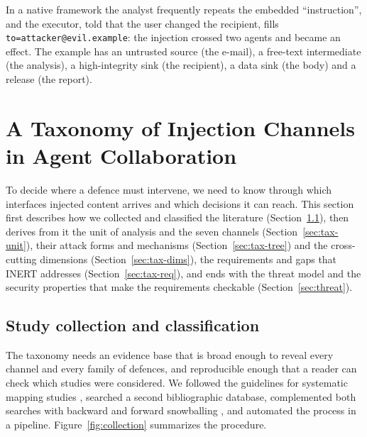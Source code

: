\documentclass[pdflatex,sn-mathphys-num]{sn-jnl}
\theoremstyle{thmstyleone}%
\theoremstyle{thmstyletwo}%
\theoremstyle{thmstylethree}%
\begin{document}
In a native framework the analyst frequently repeats the embedded ``instruction'', and the executor, told that the user changed the recipient, fills \texttt{to=attacker@evil.example}: the injection crossed two agents and became an effect. The example has an untrusted source (the e-mail), a free-text intermediate (the analysis), a high-integrity sink (the recipient), a data sink (the body) and a release (the report).

\section{A Taxonomy of Injection Channels in Agent Collaboration}\label{sec:taxonomy}

To decide where a defence must intervene, we need to know through which interfaces injected content arrives and which decisions it can reach. This section first describes how we collected and classified the literature (Section~\ref{sec:tax-collection}), then derives from it the unit of analysis and the seven channels (Section~\ref{sec:tax-unit}), their attack forms and mechanisms (Section~\ref{sec:tax-tree}) and the cross-cutting dimensions (Section~\ref{sec:tax-dims}), the requirements and gaps that INERT addresses (Section~\ref{sec:tax-req}), and ends with the threat model and the security properties that make the requirements checkable (Section~\ref{sec:threat}).

\subsection{Study collection and classification}\label{sec:tax-collection}

The taxonomy needs an evidence base that is broad enough to reveal every channel and every family of defences, and reproducible enough that a reader can check which studies were considered. We followed the guidelines for systematic mapping studies \citep{petersen2015mapping,kitchenham2007guidelines}, searched a second bibliographic database, complemented both searches with backward and forward snowballing \citep{wohlin2014snowballing}, and automated the process in a pipeline. Figure~\ref{fig:collection} summarizes the procedure. %
\end{document}
